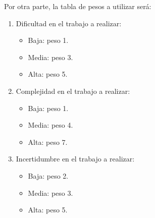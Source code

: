 \documentclass[
11pt, %
]{charter}
\begin{document}
Por otra parte, la tabla de pesos a utilizar será:
\begin{enumerate}
\item Dificultad en el trabajo a realizar:
	\begin{itemize}
		\item Baja: peso 1.
		\item Media: peso 3.
		\item Alta: peso 5.
	\end{itemize}

\item Complejidad en el trabajo a realizar:
	\begin{itemize}
		\item Baja: peso 1.
		\item Media: peso 4.
		\item Alta: peso 7.
	\end{itemize}

\item Incertidumbre en el trabajo a realizar:
	\begin{itemize}
		\item Baja: peso 2.
		\item Media: peso 3.
		\item Alta: peso 5.
	\end{itemize}
\end{enumerate}
\end{document}
